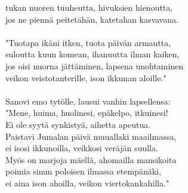 tukan nuoren tuuheutta, hivuksien hienoutta,                  \\
jos ne piennä peitetähän, katetahan kasvavana.                \\
                                                              \\
"Tuotapa ikäni itken, tuota päivän armautta,                  \\
suloutta kuun komean, ihanuutta ilman kaiken,                 \\
jos oisi nuorna jättäminen, lapsena unohtaminen               \\
veikon veistotanterille, ison ikkunan aloille."               \\
                                                              \\
Sanovi emo tytölle, lausui vanhin lapsellensa:                \\
"Mene, huima, huolinesi, epäkelpo, itkuinesi!                 \\
Ei ole syytä synkistyä, aihetta apeutua.                      \\
Paistavi Jumalan päivä muuallaki maailmassa,                  \\
ei isosi ikkunoilla, veikkosi veräjän suulla.                 \\
Myös on marjoja mäellä, ahomailla mansikoita                  \\
poimia sinun poloisen ilmassa etempänäki,                     \\
ei aina ison ahoilla, veikon viertokankahilla."               \\